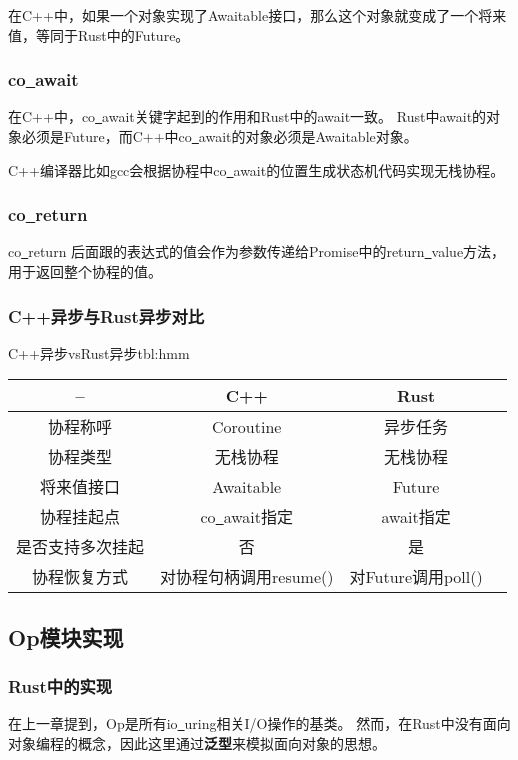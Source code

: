\documentclass[supercite]{HustGraduPaper}
\theoremstyle{definition}
\begin{document}
在C++中，如果一个对象实现了Awaitable接口，那么这个对象就变成了一个将来值，等同于Rust中的Future。\par

\subsubsection{co\underline{~}await}
在C++中，co\underline{~}await关键字起到的作用和Rust中的await一致。
Rust中await的对象必须是Future，而C++中co\underline{~}await的对象必须是Awaitable对象。\par

C++编译器比如gcc会根据协程中co\underline{~}await的位置生成状态机代码实现无栈协程。\par

\subsubsection{co\underline{~}return}

co\underline{~}return 后面跟的表达式的值会作为参数传递给Promise中的return\underline{~}value方法，
用于返回整个协程的值。\par

\subsubsection{C++异步与Rust异步对比}

\begin{generaltab}{C++异步vsRust异步}{tbl:hmm}
  \begin{tabular}{c|ccc}
    \toprule
    -- & C++ & Rust \\
    \midrule
    协程称呼 & Coroutine & 异步任务 \\
    协程类型 & 无栈协程 & 无栈协程 \\
    将来值接口 & Awaitable & Future \\
    协程挂起点 & co\underline{~}await指定 & await指定 \\
    是否支持多次挂起 & 否 & 是 \\
    协程恢复方式 & 对协程句柄调用resume() & 对Future调用poll() \\
    \bottomrule
  \end{tabular}
\end{generaltab}

\subsection{Op模块实现}
\subsubsection{Rust中的实现}
在上一章提到，Op是所有io\underline{~}uring相关I/O操作的基类。
然而，在Rust中没有面向对象编程的概念，因此这里通过\textbf{泛型}来模拟面向对象的思想。\par
\end{document}
